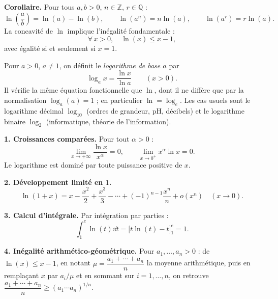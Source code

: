 
\begin{tcolorbox}[thmbox]
  \textbf{Corollaire.}\enspace%
  Pour tous $a, b > 0$, $n \in \mathbb{Z}$, $r \in \mathbb{Q}$ :
  \[
    \ln\!\left(\frac{a}{b}\right) = \ln(a)-\ln(b), \qquad
    \ln(a^n) = n\ln(a), \qquad
    \ln(a^r) = r\ln(a).
  \]
  La concavité de $\ln$ implique l'inégalité fondamentale :
  \[
    \forall\, x > 0,\quad \ln(x) \leq x - 1,
  \]
  avec égalité si et seulement si $x = 1$.
\end{tcolorbox}

Pour $a > 0$, $a \neq 1$, on définit le \emph{logarithme de base
$a$} par
\[
  \log_a x = \frac{\ln x}{\ln a} \qquad (x > 0).
\]
Il vérifie la même équation fonctionnelle que $\ln$, dont il ne diffère que
par la normalisation $\log_a(a) = 1$ ; en particulier $\ln = \log_e$.
Les cas usuels sont le logarithme décimal $\log_{10}$ (ordres de grandeur,
pH, décibels) et le logarithme binaire $\log_2$ (informatique, théorie de
l'information).

\decsep{}



\begin{mdframed}[style=exbar]
  \textbf{1. Croissances comparées.}
  Pour tout $\alpha > 0$ :
  \[
    \lim_{x\to+\infty}\frac{\ln x}{x^\alpha} = 0, \qquad
    \lim_{x\to 0^+} x^\alpha \ln x = 0.
  \]
  Le logarithme est dominé par toute puissance positive de $x$.

  \smallskip\noindent
  \textbf{2. Développement limité en $1$.}
  \[
    \ln(1+x) = x - \frac{x^2}{2} + \frac{x^3}{3} - \cdots
    + {(-1)}^{n-1}\frac{x^n}{n} + o(x^n) \quad (x\to 0).
  \]

  \smallskip\noindent
  \textbf{3. Calcul d'intégrale.}
  Par intégration par parties :
  \[
    \int_1^e \ln(t)\dd t = \bigl[t\ln(t)-t\bigr]_1^e = 1.
  \]

  \smallskip\noindent
  \textbf{4. Inégalité arithmético-géométrique.}
  Pour $a_1,\dots,a_n > 0$ : de $\ln(x)\leq x-1$, en notant
  $\mu = \dfrac{a_1+\cdots+a_n}{n}$ la moyenne
  arithmétique, puis en remplaçant $x$ par $a_i/\mu$ et en sommant
  sur $i = 1,\dots,n$, on retrouve
  $\dfrac{a_1+\cdots+a_n}{n}\geq {(a_1\cdots a_n)}^{1/n}$.
\end{mdframed}

